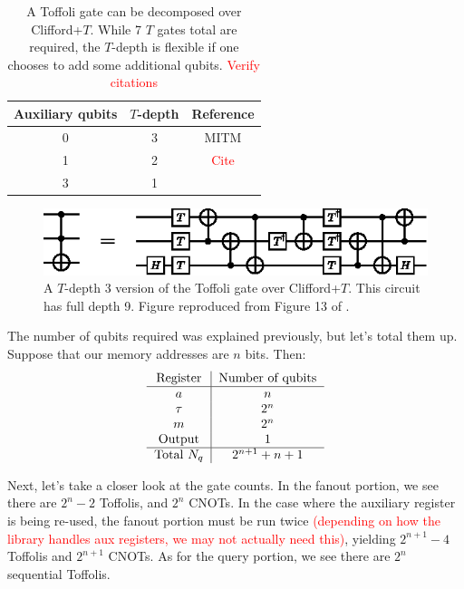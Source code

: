 \documentclass[a4paper,12pt]{article}
\newcommand\todo[1]{\textcolor{red}{#1}}
\begin{document}
\begin{table}
 \centering
  \captionsetup{width=.89\linewidth}
 \begin{tabular}{|c|c|c|}
  \hline
  Auxiliary qubits & $T$-depth & Reference \\ \hline
  0 & 3 & MITM \\ \hline
  1 & 2 & \todo{Cite} \\ \hline
  3 & 1 & \cite{Selinger2013} \\ \hline
 \end{tabular}
 \caption{A Toffoli gate can be decomposed over Clifford+$T$. 
 While 7 $T$ gates total are required, the $T$-depth is flexible if one chooses to add some additional qubits. \todo{Verify citations} }
 \label{tab:toffoli-tdepth}
\end{table}

\begin{figure}[h]
 \centering
 \captionsetup{width=.89\linewidth}
 \includegraphics[scale=1.5]{images/toffoli}
 \caption{A $T$-depth 3 version of the Toffoli gate over Clifford+$T$. 
 This circuit has full depth 9. 
 Figure reproduced from Figure 13 of \cite{MITM}.}
 \label{fig:toffoli-tdepth-3}
\end{figure}


The number of qubits required was explained previously, but let's total them up. 
Suppose that our memory addresses are $n$ bits. 
Then:
\begin{equation}
 \begin{tabular}{c|c}
  Register & Number  of qubits \\ \hline
  $a$ & $n$ \\
  $\tau$ & $2^n$ \\
  $m$ & $2^n$ \\
  Output & 1 \\ \hline
  Total $N_q$ & $2^{n+1} + n + 1$
 \end{tabular}
\end{equation} 

Next, let's take a closer look at the gate counts. 
In the fanout portion, we see there are $2^n - 2$ Toffolis, and $2^n$ CNOTs. 
In the case where the auxiliary register is being re-used, the fanout portion must be run twice \todo{(depending on how the library handles aux registers, we may not actually need this)}, yielding $2^{n+1} - 4$ Toffolis and $2^{n+1}$ CNOTs. 
As for the query portion, we see there are $2^n$ sequential Toffolis.
\end{document}
